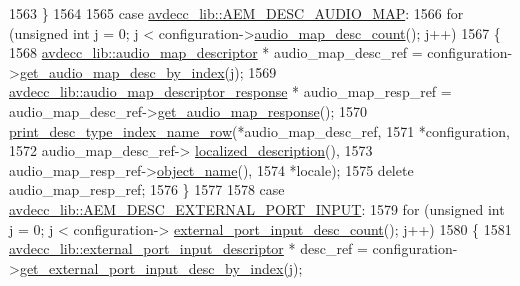 \begin{DoxyCode}
1563             \}
1564 
1565         \textcolor{keywordflow}{case} \hyperlink{namespaceavdecc__lib_ac7b7d227e46bc72b63ee9e9aae15902fab7cc7534edb71a30193e3c41bf920cf5}{avdecc\_lib::AEM\_DESC\_AUDIO\_MAP}:
1566             \textcolor{keywordflow}{for} (\textcolor{keywordtype}{unsigned} \textcolor{keywordtype}{int} j = 0; j < configuration->\hyperlink{classavdecc__lib_1_1configuration__descriptor_a591e29d13b318216c95007e92e05ff8f}{audio\_map\_desc\_count}(); j++)
1567             \{
1568                 \hyperlink{classavdecc__lib_1_1audio__map__descriptor}{avdecc\_lib::audio\_map\_descriptor} * audio\_map\_desc\_ref = 
      configuration->\hyperlink{classavdecc__lib_1_1configuration__descriptor_a2d946ae36e146b7a1bbe30e31017f20f}{get\_audio\_map\_desc\_by\_index}(j);
1569                 \hyperlink{classavdecc__lib_1_1audio__map__descriptor__response}{avdecc\_lib::audio\_map\_descriptor\_response} * 
      audio\_map\_resp\_ref = audio\_map\_desc\_ref->\hyperlink{classavdecc__lib_1_1audio__map__descriptor_ac333ca48d369f97aac9172267b5c5a61}{get\_audio\_map\_response}();
1570                 \hyperlink{classcmd__line_ac47c21c03b69593b74e7c43201d0ba41}{print\_desc\_type\_index\_name\_row}(*audio\_map\_desc\_ref,
1571                                                *configuration,
1572                                                audio\_map\_desc\_ref->
      \hyperlink{classavdecc__lib_1_1descriptor__base_a1fb9de45567df344090a1407aa6b775f}{localized\_description}(),
1573                                                audio\_map\_resp\_ref->\hyperlink{classavdecc__lib_1_1descriptor__response__base_a133f7774946d80f82b8aaaa4cfbb7361}{object\_name}(),
1574                                                *locale);
1575                 \textcolor{keyword}{delete} audio\_map\_resp\_ref;
1576             \}
1577 
1578         \textcolor{keywordflow}{case} \hyperlink{namespaceavdecc__lib_ac7b7d227e46bc72b63ee9e9aae15902fafd26fe044fb2548e13163acbfad1812c}{avdecc\_lib::AEM\_DESC\_EXTERNAL\_PORT\_INPUT}:
1579             \textcolor{keywordflow}{for} (\textcolor{keywordtype}{unsigned} \textcolor{keywordtype}{int} j = 0; j < configuration->
      \hyperlink{classavdecc__lib_1_1configuration__descriptor_a88158805661b69b56051916e25de58cc}{external\_port\_input\_desc\_count}(); j++)
1580             \{
1581                 \hyperlink{classavdecc__lib_1_1external__port__input__descriptor}{avdecc\_lib::external\_port\_input\_descriptor} * 
      desc\_ref = configuration->\hyperlink{classavdecc__lib_1_1configuration__descriptor_a0ce53511b68efa1e6e992431faac667e}{get\_external\_port\_input\_desc\_by\_index}(j);

\end{DoxyCode}

